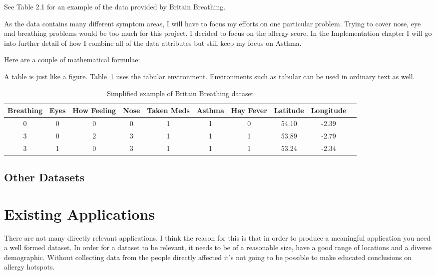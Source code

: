 See Table 2.1 for an example of the data provided by Britain Breathing.

As the data contains many different symptom areas, I will have to focus my efforts on one particular problem. Trying to cover nose, eye and breathing problems would be too much for this project. I decided to focus on the allergy score. In the Implementation chapter I will go into further detail of how I combine all of the data attributes but still keep my focus on Asthma.

Here are a couple of mathematical formulae:


A table is just like a figure. Table~\ref{wombat} uses the tabular
environment.  Environments such as tabular can be used in ordinary
text as well.
\begin{table}
\begin{center}
\begin{tabular}{|c|c|c|c|c|c|c|c|c|c}\hline\hline
Breathing&Eyes&How Feeling&Nose&Taken Meds&Asthma&Hay Fever&Latitude&Longitude\\\hline
0&0&0&0&1&1&0&54.10&-2.39\\
3&0&2&3&1&1&1&53.89&-2.79\\
3&1&0&3&1&1&1&53.24&-2.34\\\hline\hline
\end{tabular}
\end{center}
\caption{Simplified example of Britain Breathing dataset}\label{wombat}
\end{table}

\subsection{Other Datasets}




\section{Existing Applications}
\label{sec:diagrams}

There are not many directly relevant applications. I think the reason for this is that in order to produce a meaningful application you need a well formed dataset. In order for a dataset to be relevant, it needs to be of a reasonable size, have a good range of locations and a diverse demographic. Without collecting data from the people directly affected it's not going to be possible to make educated conclusions on allergy hotspots.\\

